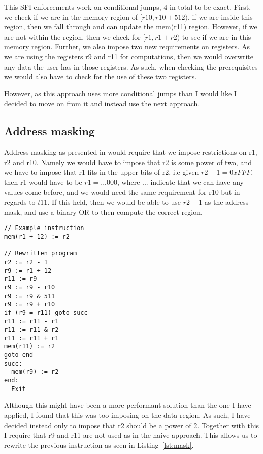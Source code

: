 This SFI enforcements work on conditional jumps, 4 in total to be exact. First,
we check if we are in the memory region of $[r10, r10 + 512)$, if we are inside
this region, then we fall through and can update the mem(r11) region. However,
if we are not within the region, then we check for $[r1, r1+r2)$ to see if we
are in this memory region. Further, we also impose two new requirements on
registers. As we are using the registers r9 and r11 for computations, then we
would overwrite any data the user has in those registers. As such, when
checking the prerequisites we would also have to check for the use of these two
registers.

However, as this approach uses more conditional jumps than I would like I
decided to move on from it and instead use the next approach.

\subsection{Address masking}\label{sec:address}
Address masking as presented in \cite{SFI} would require that we impose
restrictions on r1, r2 and r10. Namely we would have to impose that r2 is some
power of two, and we have to impose that r1 fits in the upper bits of r2, i.e
given $r2 - 1 = 0xFFF$, then r1 would have to be $r1=...000$, where ...
indicate that we can have any values come before, and we would need the same
requirement for r10 but in regards to $t11$. If this held, then we would be
able to use $r2-1$ as the address mask, and use a binary OR to then compute the
correct region.

\begin{lstlisting}[caption={Example program}, label={lst:mask}, mathescape=true]
// Example instruction
mem(r1 + 12) := r2

// Rewritten program
r2 := r2 - 1
r9 := r1 + 12
r11 := r9
r9 := r9 - r10
r9 := r9 & 511
r9 := r9 + r10
if (r9 = r11) goto succ
r11 := r11 - r1
r11 := r11 & r2
r11 := r11 + r1
mem(r11) := r2
goto end
succ:
  mem(r9) := r2
end:
  Exit
\end{lstlisting}

Although this might have been a more performant solution than the one I have
applied, I found that this was too imposing on the data region. As such, I have
decided instead only to impose that r2 should be a power of 2. Together with
this I require that r9 and r11 are not used as in the naive approach. This
allows us to rewrite the previous instruction as seen in Listing~\ref{lst:mask}.

